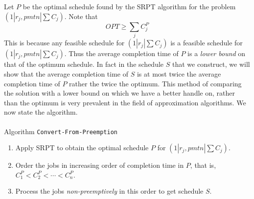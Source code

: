 \documentclass[11pt]{article}
\begin{document}
Let $P$ be the optimal schedule found by the SRPT algorithm for the problem $(1|r_j,pmtn|\sum C_j)$. Note that 
\begin{equation}\label{eq:lb}
OPT \ge \sum_j C^P_j
\end{equation}
This is because any feasible schedule for $(1|r_j|\sum C_j)$ is a feasible schedule for $(1|r_j,pmtn|\sum C_j)$.
Thus the average completion time of $P$ is a {\em lower bound} on that of the optimum schedule.
In fact in the schedule $S$ that we construct, we will show that the average completion time of $S$ is at most twice the 
average completion time of $P$ rather the twice the optimum. This method of comparing the solution with a lower
bound on which we have a better handle on, rather than the optimum is very prevalent in the field of approximation 
algorithms. We now state the algorithm. \\
\\
\noindent
Algorithm {\tt Convert-From-Preemption} 
\begin{enumerate}
\item Apply SRPT to obtain the optimal schedule $P$ for $(1|r_j,pmtn|\sum C_j)$.
\item Order the jobs in increasing order of completion time in $P$, that is, \\
$C^P_1 < C^P_2 < \cdots < C^P_n$.
\item Process the jobs {\em non-preemptively} in this order to get schedule $S$.
\end{enumerate}
\end{document}
